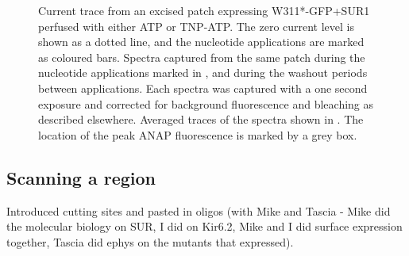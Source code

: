 \begin{figure}[h]
\begin{subfigure}[t]{0.4\textwidth}
	\end{subfigure}
	\caption[ANAP is not quenched by ATP]{
	 Current trace from an excised patch expressing W311*-GFP+SUR1 perfused with either ATP or TNP-ATP.
	The zero current level is shown as a dotted line, and the nucleotide applications are marked as coloured bars.
	 Spectra captured from the same patch during the nucleotide applications marked in , and during the washout periods between applications.
	Each spectra was captured with a one second exposure and corrected for background fluorescence and bleaching as described elsewhere.
	 Averaged traces of the spectra shown in . The location of the peak ANAP fluorescence is marked by a grey box.
	}
\end{figure}


\subsection{Scanning a region}

Introduced cutting sites and pasted in oligos
(with Mike and Tascia - Mike did the molecular biology on SUR, I did on Kir6.2, Mike and I did surface expression together, Tascia did ephys on the mutants that expressed).
